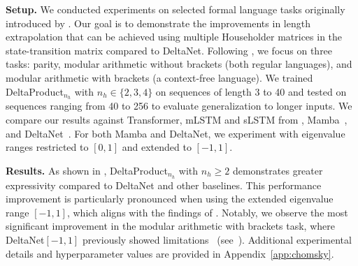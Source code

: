 \documentclass{article} %
\begin{document}
\textbf{Setup.} We conducted experiments on selected formal language tasks originally introduced by \citet{deletang-iclr23a}. Our goal is to demonstrate the improvements in length extrapolation that can be achieved using multiple Householder matrices in the state-transition matrix compared to DeltaNet. Following \citet{grazzi-iclr25a}, we focus on three tasks: parity, modular arithmetic without brackets (both regular languages), and modular arithmetic with brackets (a context-free language). We trained DeltaProduct$_{n_h}$ with $n_h \in \{2,3,4\}$ on sequences of length 3 to 40 and tested on sequences ranging from 40 to 256 to evaluate generalization to longer inputs. We compare our results against Transformer, mLSTM and sLSTM from \citet{beck-neurips24a}, Mamba~\citep{gu2023mamba}, and DeltaNet~\citep{yang-neurips24a}. For both Mamba and DeltaNet, we experiment with eigenvalue ranges restricted to $[0,1]$ and extended to $[-1,1]$.


\textbf{Results.} 
 As shown in , DeltaProduct$_{n_h}$ with $n_h \geq 2$ demonstrates greater expressivity compared to DeltaNet and other baselines. This performance improvement is particularly pronounced when using the extended eigenvalue range $[-1, 1]$, which aligns with the findings of \citet{grazzi-iclr25a}. Notably, we observe the most significant improvement in the modular arithmetic with brackets task, where DeltaNet$[-1,1]$ previously showed limitations~\citep{grazzi-iclr25a} (see~). 
 Additional experimental details and hyperparameter values are provided in Appendix~\ref{app:chomsky}.
\end{document}
